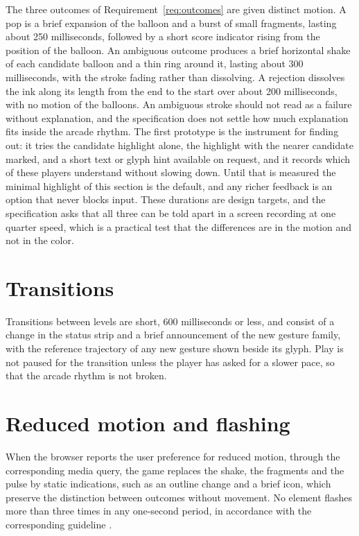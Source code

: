 The three outcomes of Requirement~\ref{req:outcomes} are given distinct motion. A pop is a brief expansion of the balloon and a burst of small fragments, lasting about 250 milliseconds, followed by a short score indicator rising from the position of the balloon. An ambiguous outcome produces a brief horizontal shake of each candidate balloon and a thin ring around it, lasting about 300 milliseconds, with the stroke fading rather than dissolving. A rejection dissolves the ink along its length from the end to the start over about 200 milliseconds, with no motion of the balloons. An ambiguous stroke should not read as a failure without explanation, and the specification does not settle how much explanation fits inside the arcade rhythm. The first prototype is the instrument for finding out: it tries the candidate highlight alone, the highlight with the nearer candidate marked, and a short text or glyph hint available on request, and it records which of these players understand without slowing down. Until that is measured the minimal highlight of this section is the default, and any richer feedback is an option that never blocks input.\evH{} These durations are design targets, and the specification asks that all three can be told apart in a screen recording at one quarter speed, which is a practical test that the differences are in the motion and not in the color.\evS

\section{Transitions}

Transitions between levels are short, 600 milliseconds or less, and consist of a change in the status strip and a brief announcement of the new gesture family, with the reference trajectory of any new gesture shown beside its glyph. Play is not paused for the transition unless the player has asked for a slower pace, so that the arcade rhythm is not broken.

\section{Reduced motion and flashing}

When the browser reports the user preference for reduced motion, through the corresponding media query, the game replaces the shake, the fragments and the pulse by static indications, such as an outline change and a brief icon, which preserve the distinction between outcomes without movement.\evD{} No element flashes more than three times in any one-second period, in accordance with the corresponding guideline \cite{wcag22}.\evD{}


